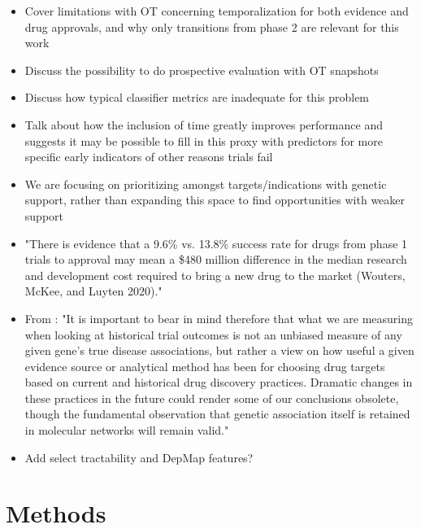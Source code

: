\documentclass{article}
\begin{document}
\begin{itemize}
  \item Cover limitations with OT concerning temporalization for both evidence and drug approvals, and why only transitions from phase 2 are relevant for this work
  \item Discuss the possibility to do prospective evaluation with OT snapshots
  \item Discuss how typical classifier metrics are inadequate for this problem
  \item Talk about how the inclusion of time greatly improves performance and suggests it may be possible to fill in this proxy with predictors for more specific early indicators of other reasons trials fail
  \item We are focusing on prioritizing amongst targets/indications with genetic support, rather than expanding this space to find opportunities with weaker support
  \item "There is evidence that a 9.6\% vs. 13.8\% success rate for drugs from phase 1 trials to approval may mean a \$480 million difference in the median research and development cost required to bring a new drug to the market (Wouters, McKee, and Luyten 2020)." \cite{PMID:34930919}
  \item From \cite{PMID:33262371}: "It is important to bear in mind therefore that what we are measuring when looking at historical trial outcomes is not an unbiased measure of any given gene's true disease associations, but rather a view on how useful a given evidence source or analytical method has been for choosing drug targets based on current and historical drug discovery practices. Dramatic changes in these practices in the future could render some of our conclusions obsolete, though the fundamental observation that genetic association itself is retained in molecular networks will remain valid."
  \item Add select tractability and DepMap features?
\end{itemize}

\section{Methods}
\label{sec:methods}
\end{document}
